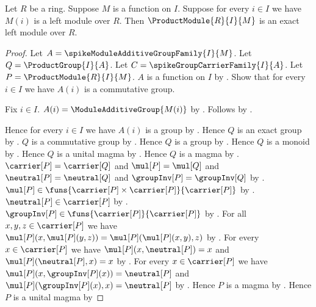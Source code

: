\begin{theorem}\label{spike_product_module_is_exact}
    Let $R$ be a ring.
    Suppose $M$ is a function on $I$.
    Suppose for every $i\in I$ we have $M(i)$ is a left module over $R$.
    Then $\ProductModule{R}{I}{M}$ is an exact left module over $R$.
\end{theorem}
\begin{proof}
    Let $A=\spikeModuleAdditiveGroupFamily{I}{M}$.
    Let $Q=\ProductGroup{I}{A}$.
    Let $C=\spikeGroupCarrierFamily{I}{A}$.
    Let $P=\ProductModule{R}{I}{M}$.
    $A$ is a function on $I$ by
        .
    Show that for every $i\in I$ we have $A(i)$ is a commutative group.
    \begin{subproof}
        Fix $i\in I$.
        $A(i)=\ModuleAdditiveGroup{M(i)}$ by
            .
        Follows by .
    \end{subproof}
    Hence for every $i\in I$ we have $A(i)$ is a group by
        .
    Hence $Q$ is an exact group by
        .
    $Q$ is a commutative group by
        .
    Hence $Q$ is a group by .
    Hence $Q$ is a monoid by .
    Hence $Q$ is a unital magma by .
    Hence $Q$ is a magma by .
    $\carrier[P]=\carrier[Q]$ and $\mul[P]=\mul[Q]$ and
        $\neutral[P]=\neutral[Q]$ and
        $\groupInv[P]=\groupInv[Q]$ by
        .
    $\mul[P]\in
        \funs{\carrier[P]\times\carrier[P]}{\carrier[P]}$ by
        .
    $\neutral[P]\in\carrier[P]$ by .
    $\groupInv[P]\in\funs{\carrier[P]}{\carrier[P]}$ by
        .
    For all $x,y,z\in\carrier[P]$ we have
        $\mul[P](x,\mul[P](y,z))=\mul[P](\mul[P](x,y),z)$ by
        .
    For every $x\in\carrier[P]$ we have
        $\mul[P](x,\neutral[P])=x$ and
        $\mul[P](\neutral[P],x)=x$ by
        .
    For every $x\in\carrier[P]$ we have
        $\mul[P](x,\groupInv[P](x))=\neutral[P]$ and
        $\mul[P](\groupInv[P](x),x)=\neutral[P]$ by
        .
    Hence $P$ is a magma by
        .
    Hence $P$ is a unital magma by

\end{proof}
